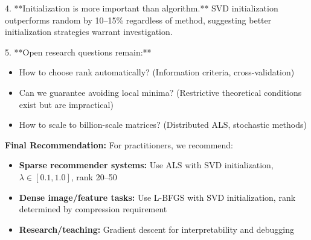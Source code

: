 \documentclass[11pt,a4paper]{article}
\begin{document}
4. **Initialization is more important than algorithm.** SVD initialization outperforms random by 10--15\% regardless of method, suggesting better initialization strategies warrant investigation.

5. **Open research questions remain:**
   \begin{itemize}
     \item How to choose rank automatically? (Information criteria, cross-validation)
     \item Can we guarantee avoiding local minima? (Restrictive theoretical conditions exist but are impractical)
     \item How to scale to billion-scale matrices? (Distributed ALS, stochastic methods)
   \end{itemize}

\textbf{Final Recommendation:}
For practitioners, we recommend:
\begin{itemize}
  \item \textbf{Sparse recommender systems:} Use ALS with SVD initialization, $\lambda \in [0.1, 1.0]$, rank 20--50
  \item \textbf{Dense image/feature tasks:} Use L-BFGS with SVD initialization, rank determined by compression requirement
  \item \textbf{Research/teaching:} Gradient descent for interpretability and debugging
\end{itemize}
\end{document}
